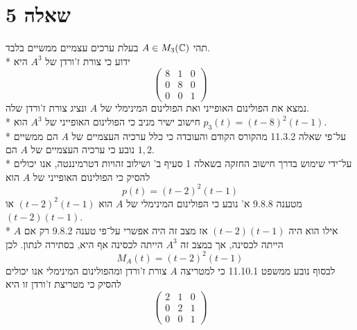 \section{שאלה 5}
תהי $A \in M_3(\mathbb{C})$ בעלת ערכים עצמיים ממשיים בלבד. \\*
ידוע כי צורת ז'ורדן של $A^3$ היא
\[
	\begin{pmatrix}
		8 & 1 & 0 \\
		0 & 8 & 0 \\
		0 & 0 & 1
	\end{pmatrix}
\]
נמצא את הפולינום האופייני ואת הפולינום המינימלי של $A$ ונציג צורת ז'ורדן שלה. \\*
חישוב ישיר מניב כי הפולינום האופייני של $A^3$ הוא $p_3(t) = {(t - 8)}^2 (t - 1)$. \\*
על־פי שאלה 11.3.2 מהקורס הקודם והעובדה כי כלל ערכיה העצמיים של $A$ הם ממשיים נובע כי ערכיה העצמיים של $A$ הם $1, 2$. \\*
על־ידי שימוש בדרך חישוב החזקה בשאלה 1 סעיף ב' ושילוב זהויות דטרמיננטה, אנו יכולים להסיק כי הפולינום האופייני של $A$ הוא
\[
	p(t) = {(t - 2)}^2 (t - 1)
\]
מטענה 9.8.8 א' נובע כי הפולינום המינימלי של $A$ הוא ${(t - 2)}^2(t-1)$ או $(t - 2)(t - 1)$. \\*
אילו הוא היה $(t - 2)(t - 1)$ אז מצב זה היה אפשרי על־פי טענה 9.8.2 רק אם $A$ הייתה לכסינה, אך במצב זה $A^3$ הייתה לכסינה אף היא, בסתירה לנתון. לכן
\[
	M_A(t) = {(t - 2)}^2 (t - 1) 
\]
לבסוף נובע ממשפט 11.10.1 כי למטריצה $A$ צורת ז'ורדן ומהפולינום המינימלי אנו יכולים להסיק כי מטריצת ז'ורדן זו היא
\[
	\begin{pmatrix}
		2 & 1 & 0 \\
		0 & 2 & 1 \\
		0 & 0 & 1
	\end{pmatrix}
\]



